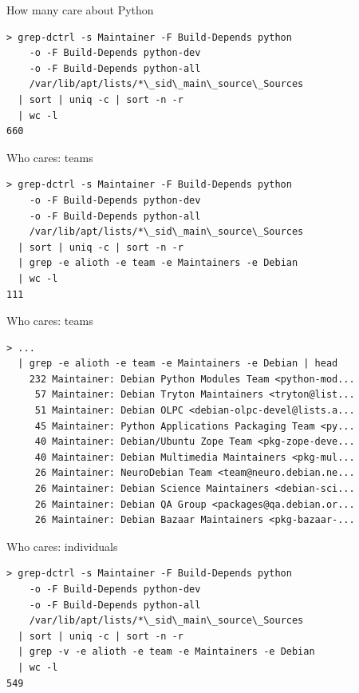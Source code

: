 \documentclass[]{beamer}
\begin{document}
{%

\begin{frame}[fragile]{How many care about Python}
\begin{verbatim}
> grep-dctrl -s Maintainer -F Build-Depends python
    -o -F Build-Depends python-dev
	-o -F Build-Depends python-all
	/var/lib/apt/lists/*\_sid\_main\_source\_Sources
  | sort | uniq -c | sort -n -r
  | wc -l
660
\end{verbatim}
\end{frame}

\begin{frame}[fragile]{Who cares: teams}
\begin{verbatim}
> grep-dctrl -s Maintainer -F Build-Depends python
    -o -F Build-Depends python-dev
	-o -F Build-Depends python-all
	/var/lib/apt/lists/*\_sid\_main\_source\_Sources
  | sort | uniq -c | sort -n -r
  | grep -e alioth -e team -e Maintainers -e Debian
  | wc -l
111
\end{verbatim}
\end{frame}

\begin{frame}[fragile]{Who cares: teams}
\begin{verbatim}
> ...
  | grep -e alioth -e team -e Maintainers -e Debian | head
    232 Maintainer: Debian Python Modules Team <python-mod...
     57 Maintainer: Debian Tryton Maintainers <tryton@list...
     51 Maintainer: Debian OLPC <debian-olpc-devel@lists.a...
     45 Maintainer: Python Applications Packaging Team <py...
     40 Maintainer: Debian/Ubuntu Zope Team <pkg-zope-deve...
     40 Maintainer: Debian Multimedia Maintainers <pkg-mul...
     26 Maintainer: NeuroDebian Team <team@neuro.debian.ne...
     26 Maintainer: Debian Science Maintainers <debian-sci...
     26 Maintainer: Debian QA Group <packages@qa.debian.or...
     26 Maintainer: Debian Bazaar Maintainers <pkg-bazaar-...
\end{verbatim}
\end{frame}

\begin{frame}[fragile]{Who cares: individuals}
\begin{verbatim}
> grep-dctrl -s Maintainer -F Build-Depends python
    -o -F Build-Depends python-dev
	-o -F Build-Depends python-all
	/var/lib/apt/lists/*\_sid\_main\_source\_Sources
  | sort | uniq -c | sort -n -r
  | grep -v -e alioth -e team -e Maintainers -e Debian
  | wc -l
549
\end{verbatim}
\end{frame}

}
\end{document}
